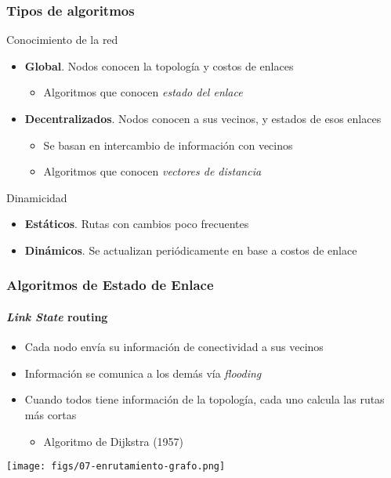 \documentclass[letter]{beamer}
\begin{document}
\begin{frame}
  \frametitle{Tipos de algoritmos}

  Conocimiento de la red
  \begin{itemize}
    \item {\bf Global}. Nodos conocen la topología y costos de enlaces
      \begin{itemize}
        \item Algoritmos que conocen {\em estado del enlace}
      \end{itemize}
    \item {\bf Decentralizados}. Nodos conocen a sus vecinos, y estados de esos enlaces
      \begin{itemize}
        \item Se basan en intercambio de información con vecinos
        \item Algoritmos que conocen {\em vectores de distancia}
      \end{itemize}
  \end{itemize}
  Dinamicidad
  \begin{itemize}
    \item {\bf Estáticos}. Rutas con cambios poco frecuentes
    \item {\bf Dinámicos}. Se actualizan periódicamente en base a costos de enlace
  \end{itemize}
\end{frame}

\begin{frame}
  \frametitle{Algoritmos de Estado de Enlace}
  \framesubtitle{{\em Link State} routing}
  
  \begin{itemize}
    \item Cada nodo envía su información de conectividad a sus vecinos
    \item Información se comunica a los demás vía {\em flooding}
    \item Cuando todos tiene información de la topología, cada uno calcula las rutas más cortas
      \begin{itemize}
        \item Algoritmo de Dijkstra (1957)
      \end{itemize}
  \end{itemize}
  
  \begin{center}
    \texttt{[image: figs/07-enrutamiento-grafo.png]}
  \end{center}

  
\end{frame}
\end{document}
